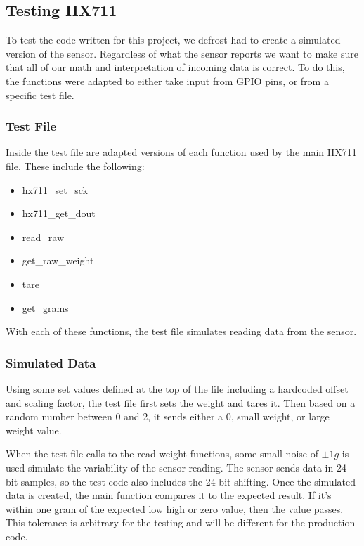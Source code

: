 \subsection{Testing HX711}

To test the code written for this project, we defrost had to create a simulated version of the sensor. Regardless of what the sensor reports we want to make sure that all of our math and interpretation of incoming data is correct. To do this, the functions were adapted to either take input from GPIO pins, or from a specific test file. 

\subsubsection{Test File}

Inside the test file are adapted versions of each function used by the main HX711 file. These include the following:

\begin{itemize}
\item hx711\_set\_sck
\item hx711\_get\_dout
\item read\_raw
\item get\_raw\_weight
\item tare
\item get\_grams
\end{itemize}

With each of these functions, the test file simulates reading data from the sensor. 

\subsubsection{Simulated Data}

Using some set values defined at the top of the file including a hardcoded offset and scaling factor, the test file first sets the weight and tares it. Then based on a random number between 0 and 2, it sends either a 0, small weight, or large weight value. 

When the test file calls to the read weight functions, some small noise of $\pm1g$ is used simulate the variability of the sensor reading. The sensor sends data in 24 bit samples, so the test code also includes the 24 bit shifting. Once the simulated data is created, the main function compares it to the expected result. If it's within one gram of the expected low high or zero value, then the value passes. This tolerance is arbitrary for the testing and will be different for the production code. 